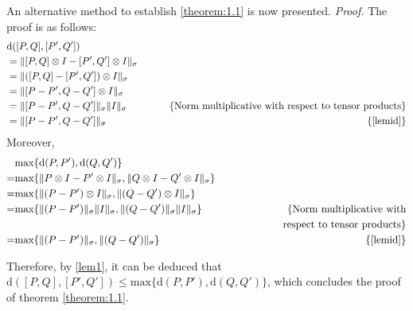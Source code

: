 An alternative method to establish \autoref{theorem:1.1} is now presented.
\vspace{5pt}
\textit {Proof.} The proof is as follows:
\begin{equation}
  \begin{split}
    & \text{d} ([P,Q],[P',Q'])  \\
    &=   \lVert  [P,Q] \otimes I - [P',Q'] \otimes I    \rVert_{\sigma} \hspace{2pt} \\
    &=   \lVert  ([P,Q]  - [P',Q']) \otimes I    \rVert_{\sigma} \hspace{2pt} \\
    &=   \lVert  [P-P',Q-Q'] \otimes I  \rVert_{\sigma}   \\
    &=    \lVert  [P-P',Q-Q'] \rVert_{\sigma} \lVert I \rVert_{\sigma}\hspace{2pt} & \hspace {20pt} \text{\{Norm multiplicative with respect to tensor products\}} \\ 
    &=    \lVert  [P-P',Q-Q'] \rVert_{\sigma} & \text{\{\autoref{lemid}\}}  \\
  \end{split}
  \end{equation}
Moreover,
\begin{equation}
  \begin{split}
     &  \text{max} \{\text{d} (P,P'),\text{d} (Q,Q')\} \\
     = &  \text{max}\{ \lVert P \otimes I - P' \otimes I \rVert_{\sigma}, \lVert Q \otimes I - Q'\otimes I \rVert_{\sigma} \}\\
     = &  \text{max}\{ \lVert (P - P') \otimes I \rVert_{\sigma}, \lVert (Q - Q') \otimes I \rVert_{\sigma} \}\\
     = &\text{max}\{ \lVert (P - P') \rVert_{\sigma} \lVert  I \rVert_{\sigma}, \lVert (Q - Q') \rVert_{\sigma} \lVert I \rVert_{\sigma} \} & \hspace{60pt} \text{\{Norm multiplicative with}\\
     && \text{respect to tensor products\}} \\
     = & \text{max}\{ \lVert (P - P') \rVert_{\sigma}, \lVert (Q - Q') \rVert_{\sigma}  \}  & \text{\{\autoref{lemid}\}}  \\
    \end{split}
  \end{equation}

Therefore, by \autoref{lem1}, it can be deduced that $\text{d} ([P,Q],[P',Q']) \leq \text{max} \{\text{d} (P,P'),\text{d} (Q,Q')\}$, which concludes the proof of theorem \autoref{theorem:1.1}.



